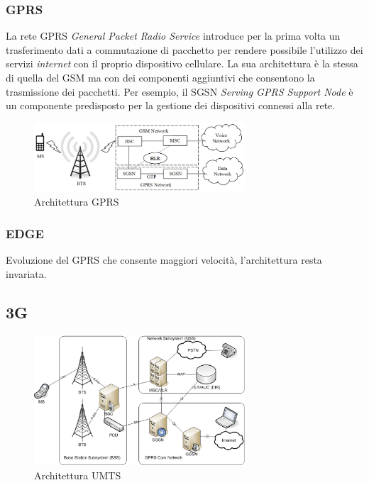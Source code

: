 \subsubsection{GPRS}
La rete GPRS \textit{General Packet Radio Service} introduce per la prima volta un trasferimento dati a commutazione di pacchetto per rendere 
possibile l'utilizzo dei servizi \textit{internet} con il proprio dispositivo cellulare\cite{gsm-architecture}.
La sua architettura è la stessa di quella del GSM ma con dei componenti aggiuntivi che consentono la trasmissione dei pacchetti. 
Per esempio, il SGSN \textit{Serving GPRS Support Node} è un componente predisposto per la gestione dei dispositivi connessi alla rete.
\begin{figure}[ht]
    \centering
    \includegraphics[width=0.7\textwidth]{images/2g-gprs.png}
    \caption{Architettura GPRS}
\end{figure}
\subsubsection{EDGE}
Evoluzione del GPRS che consente maggiori velocità, l'architettura resta invariata.

\clearpage

\subsection{3G}
\begin{figure}[ht]
    \centering
    \includegraphics[width=0.7\textwidth]{images/3g-umts.png}
    \caption{Architettura UMTS}
\end{figure}

